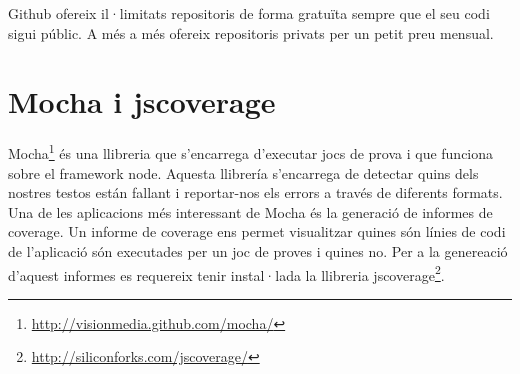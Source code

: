 Github ofereix il·limitats repositoris de forma gratuïta sempre que el seu codi sigui públic. A més a més ofereix repositoris privats per un petit preu mensual. 

\section{Mocha i jscoverage}

Mocha\footnote{\url{http://visionmedia.github.com/mocha/}} és una llibreria que s'encarrega d'executar jocs de prova i que funciona sobre el framework node. Aquesta llibrería s'encarrega de detectar quins dels nostres testos están fallant i reportar-nos els errors a través de diferents formats. Una de les aplicacions més interessant de Mocha és la generació de informes de coverage. Un informe de coverage ens permet visualitzar quines són línies de codi de l'aplicació són executades per un joc de proves i quines no. Per a la genereació d'aquest informes es requereix tenir instal·lada la llibreria jscoverage\footnote{\url{http://siliconforks.com/jscoverage/}}. 



